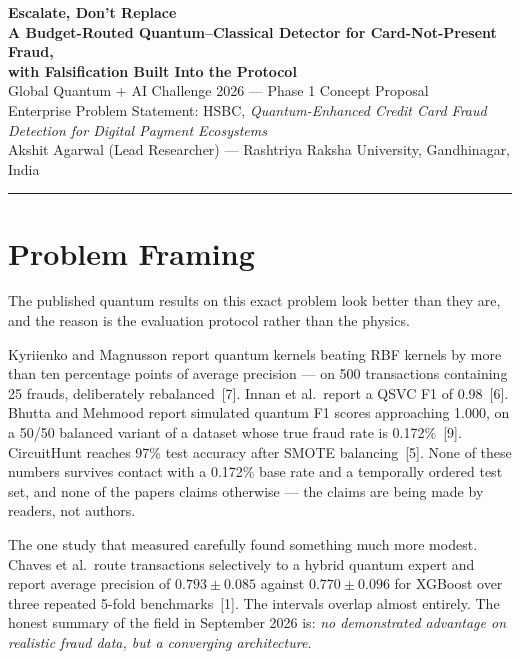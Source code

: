 \documentclass[10pt,a4paper]{article}
\begin{document}
\begin{center}
{\large\bfseries Escalate, Don't Replace}\\[2pt]
{\large\bfseries A Budget-Routed Quantum--Classical Detector for Card-Not-Present Fraud,}\\
{\large\bfseries with Falsification Built Into the Protocol}\\[6pt]
{\small Global Quantum + AI Challenge 2026 --- Phase 1 Concept Proposal\\
Enterprise Problem Statement: HSBC, \emph{Quantum-Enhanced Credit Card Fraud Detection for Digital Payment Ecosystems}\\[3pt]
Akshit Agarwal (Lead Researcher) --- Rashtriya Raksha University, Gandhinagar, India}
\end{center}

\vspace{2pt}
\hrule
\vspace{6pt}

\section{Problem Framing}

The published quantum results on this exact problem look better than they are, and the reason is the evaluation protocol rather than the physics.

Kyriienko and Magnusson report quantum kernels beating RBF kernels by more than ten percentage points of average precision --- on 500 transactions containing 25 frauds, deliberately rebalanced~[7]. Innan et al.\ report a QSVC F1 of 0.98~[6]. Bhutta and Mehmood report simulated quantum F1 scores approaching 1.000, on a 50/50 balanced variant of a dataset whose true fraud rate is 0.172\%~[9]. CircuitHunt reaches 97\% test accuracy after SMOTE balancing~[5]. None of these numbers survives contact with a 0.172\% base rate and a temporally ordered test set, and none of the papers claims otherwise --- the claims are being made by readers, not authors.

The one study that measured carefully found something much more modest. Chaves et al.\ route transactions selectively to a hybrid quantum expert and report average precision of $0.793 \pm 0.085$ against $0.770 \pm 0.096$ for XGBoost over three repeated 5-fold benchmarks~[1]. The intervals overlap almost entirely. The honest summary of the field in September 2026 is: \emph{no demonstrated advantage on realistic fraud data, but a converging architecture.}
\end{document}
